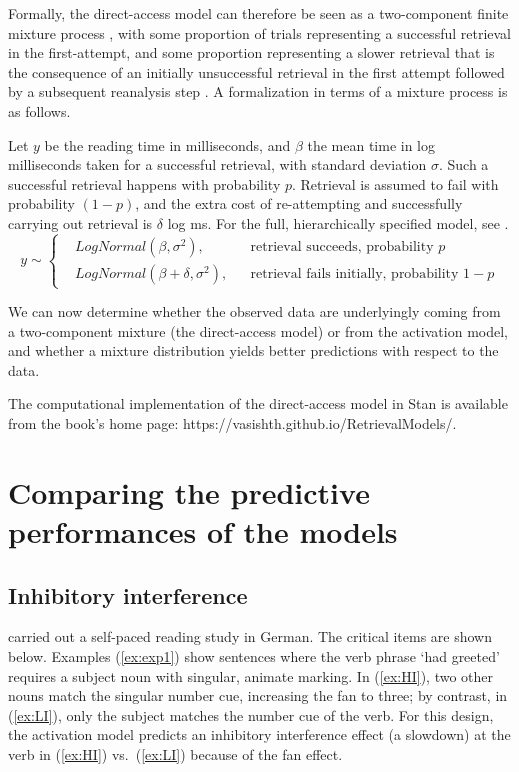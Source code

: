 \documentclass{cambridge7A}\usepackage[]{graphicx}\usepackage[]{color}
\begin{document}
Formally, the direct-access model can therefore be seen as a two-component finite mixture process \citep{mclachlan2004finite,fruhwirth2006finite}, with some proportion of trials representing a successful retrieval in the first-attempt, and some proportion representing a slower retrieval that is the consequence of an initially unsuccessful retrieval in the first attempt followed by a subsequent reanalysis step \citep{NicenboimRetrieval2018}. A formalization in terms of a mixture process is as follows.

Let $y$ be the reading time in milliseconds, and $\beta$ the mean time in log milliseconds taken for a successful retrieval, with standard deviation $\sigma$. Such a successful retrieval happens with probability $p$. Retrieval is assumed to fail with probability $(1-p)$, and the extra cost of re-attempting and successfully carrying out retrieval is $\delta$ log ms. For the full, hierarchically specified model, see \citep{NicenboimRetrieval2018}.
\begin{equation} \label{eq:mixmodsr2}
  y \sim \left \{
  \begin{aligned}
    &LogNormal(\beta,\sigma^2), && \text{retrieval succeeds, probability $p$} \\
    & LogNormal(\beta+\delta,\sigma^2), && \text{retrieval fails initially, probability $1-p$} 
  \end{aligned} \right.
\end{equation} 

We can now determine whether the observed data are underlyingly coming from a two-component mixture (the direct-access model) or from the activation model, and whether a mixture distribution yields better predictions with respect to the data.  

The \cite{NicenboimRetrieval2018} computational implementation of the direct-access model in Stan \citep{stan:2017} is available from the book's home page: https://vasishth.github.io/RetrievalModels/.

\section{Comparing the predictive performances of the models}\label{nicenboiminhint}

\subsection{Inhibitory interference}

\cite{nicenboimexploratory} carried out a self-paced reading study in German. The critical items are shown below. Examples (\ref{ex:exp1}) show  sentences where the verb phrase `had greeted' requires a subject noun with singular, animate marking. In (\ref{ex:HI}), two other nouns match the  singular number cue, increasing the fan to three; by contrast, in (\ref{ex:LI}), only the subject matches the number cue of the verb.  For this design, the activation model predicts an inhibitory interference effect (a slowdown) at the verb in (\ref{ex:HI}) vs.\ (\ref{ex:LI}) because of the fan effect.    
\end{document}
